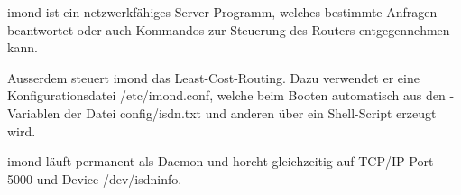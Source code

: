 

  imond ist ein netzwerkfähiges Server-Programm, welches bestimmte
  Anfragen beantwortet oder auch Kommandos zur Steuerung des Routers
  entgegennehmen kann.

  Ausserdem steuert imond das Least-Cost-Routing. Dazu verwendet er
  eine Konfigurationsdatei /etc/imond.conf, welche beim Booten
  automatisch aus den -Variablen der Datei
  config/isdn.txt und anderen über ein Shell-Script erzeugt wird.

  imond läuft permanent als Daemon und horcht gleichzeitig auf
  TCP/IP-Port 5000 und Device /dev/isdninfo.

